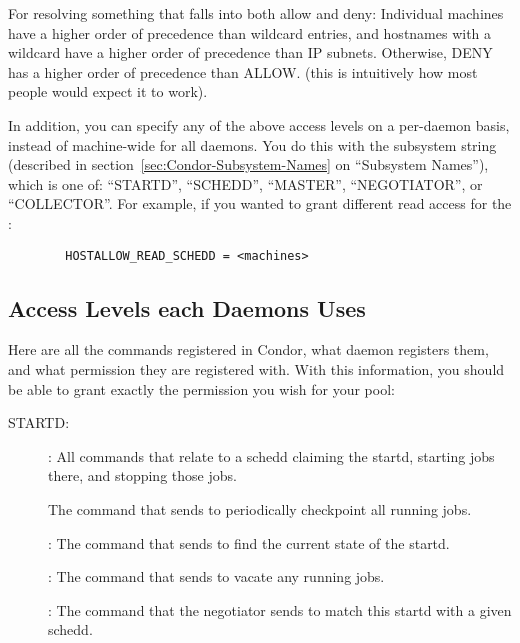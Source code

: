 For resolving something that falls into both allow and deny: Individual
machines have a higher order of precedence than wildcard entries, and
hostnames with a wildcard have a higher order of precedence than IP
subnets.  Otherwise, DENY has a higher order of precedence than ALLOW.
(this is intuitively how most people would expect it to work).  

In addition, you can specify any of the above access levels on a
per-daemon basis, instead of machine-wide for all daemons.  You do
this with the subsystem string (described in
section~\ref{sec:Condor-Subsystem-Names} on ``Subsystem Names''),
which is one of: ``STARTD'', ``SCHEDD'', ``MASTER'', ``NEGOTIATOR'',
or ``COLLECTOR''.  For example, if you wanted to grant different read
access for the :
\begin{verbatim}
        HOSTALLOW_READ_SCHEDD = <machines>
\end{verbatim}

\subsection{\label{sec:DCPerm-per-Daemon}Access Levels each Daemons
Uses} 

Here are all the commands registered in Condor, what daemon registers
them, and what permission they are registered with.  With this
information, you should be able to grant exactly the permission you
wish for your pool:


STARTD:

\begin{description}
\item[] : All commands that relate to a schedd claiming
  the startd, starting jobs there, and stopping those jobs.

  The command that  sends to periodically checkpoint
  all running jobs.

\item[] : The command that  sends to find the
  current state of the startd.

\item[] : The command that  sends to vacate
  any running jobs.

\item[] : The command that the negotiator sends to
  match this startd with a given schedd.
\end{description}

